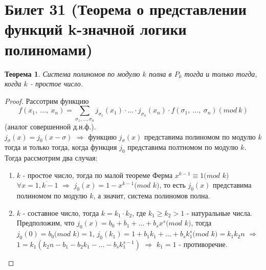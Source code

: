 \documentclass[a4paper, 12pt]{article}
\theoremstyle{definition}
\theoremstyle{plain}
\newtheorem*{theorem}{Теорема}
\theoremstyle{remark}
\begin{document}
  \section{Билет 31 (Теорема о представлении функций k-значной логики полиномами)}
  \begin{theorem}
    Система полиномов по модулю $k$ полна в $P_k$ тогда и только тогда, когда $k$ - простое число.
  \end{theorem}
  \begin{proof}
    Рассотрим функцию $$f(x_1, \ \ldots, \ x_n)=\sum\limits_{\sigma_1,\ldots,\sigma_n}j_{\sigma_1}(x_1)\cdot\ldots\cdot j_{\sigma_n}(x_n)\cdot f(\sigma_1, \ \ldots, \ \sigma_n)(mod \ k)$$ (аналог совершенной д.н.ф.).\\
    $j_{\sigma}(x)=j_0(x-\sigma)$ $\Longrightarrow$ функцию $j_{\sigma}(x)$ представима полиномом по модулю $k$ тогда и только тогда, когда функция $j_0$ представима полтномом по модулю $k$. Тогда рассмотрим два случая:
    \begin{enumerate}
      \item $k$ - простое число, тогда по малой теореме Ферма $x^{k-1}\equiv1(mod$ $k)$\\$\forall x=\overline{1,k-1}$ $\Longrightarrow$ $j_0(x)=1-x^{k-1}(mod$ $k)$, то есть $j_0(x)$ представима полиномом по модулю $k$, а значит, система полиномов полна.
      \item $k$ - составное число, тогда $k=k_1\cdot k_2$, где $k_1\geqslant k_2>1$ - натуральные числа. Предположим, что $j_0(x)=b_0+b_1+\ldots+b_sx^s(mod$ $k)$, тогда\\$j_0(0)=b_0(mod$ $k)=1$, $j_0(k_1)=1+b_1k_1+\ldots+b_sk_1^s(mod$ $k)=k_1k_2n$ $\Longrightarrow$\\$1=k_1(k_2n-b_1-b_2k_1-\ldots-b_sk_1^{s-1})$ $\Longrightarrow$ $k_1=1$ - противоречие.
    \end{enumerate}
  \end{proof}
\end{document}
